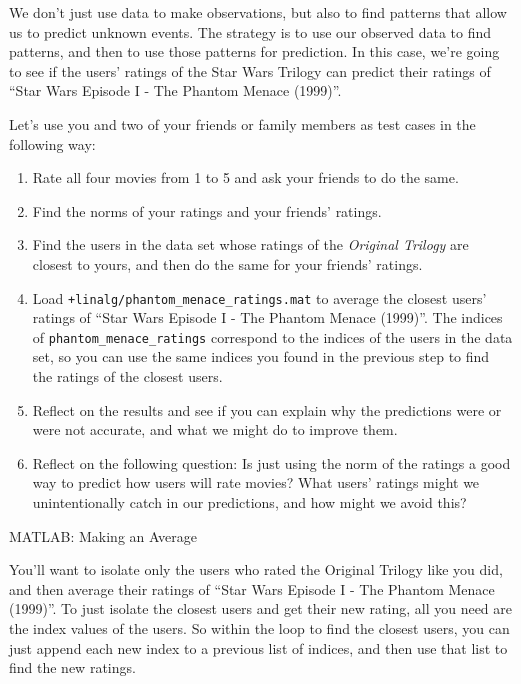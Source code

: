 \documentclass{ximera}
\begin{document}
\begin{exploration}

    We don't just use data to make observations, but also to find patterns that allow us to predict unknown events. The strategy is to use our observed data to find patterns, and then to use those patterns for prediction. In this case, we're going to see if the users' ratings of the Star Wars Trilogy can predict their ratings of ``Star Wars Episode I - The Phantom Menace (1999)''. 
    
      Let's use you and two of your friends or family members as test cases in the following way: 
    
  \begin{enumerate}
    
      \item  Rate all four movies from 1 to 5 and ask your friends to do the same. 
      \item Find the norms of your ratings and your friends' ratings.
      \item Find the users in the data set whose ratings of the \emph{Original Trilogy} are closest to yours, and then do the same for your friends' ratings.
      \item Load \texttt{+linalg/phantom\_menace\_ratings.mat} to average the closest users' ratings of ``Star Wars Episode I - The Phantom Menace (1999)''. The indices of \texttt{phantom\_menace\_ratings} correspond to the indices of the users in the data set, so you can use the same indices you found in the previous step to find the ratings of the closest users.
      \item Reflect on the results and see if you can explain why the predictions were or were not accurate, and what we might do to improve them.
      \item Reflect on the following question: Is just using the norm of the ratings a good way to predict how users will rate movies? What users' ratings might we unintentionally catch in our predictions, and how might we avoid this?
  \end{enumerate}

  \begin{remark}{MATLAB: Making an Average}

      You'll want to isolate only the users who rated the Original Trilogy like you did, and then average their ratings of ``Star Wars Episode I - The Phantom Menace (1999)''. To just isolate the closest users and get their new rating, all you need are the index values of the users. So within the loop to find the closest users, you can just append each new index to a previous list of indices, and then use that list to find the new ratings.


\end{remark}
\end{exploration}
\end{document}
